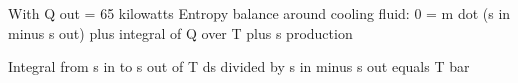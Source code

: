 With Q out = 65 kilowatts  
Entropy balance around cooling fluid:  
0 = m dot (s in minus s out) plus integral of Q over T plus s production  

Integral from s in to s out of T ds divided by s in minus s out equals T bar